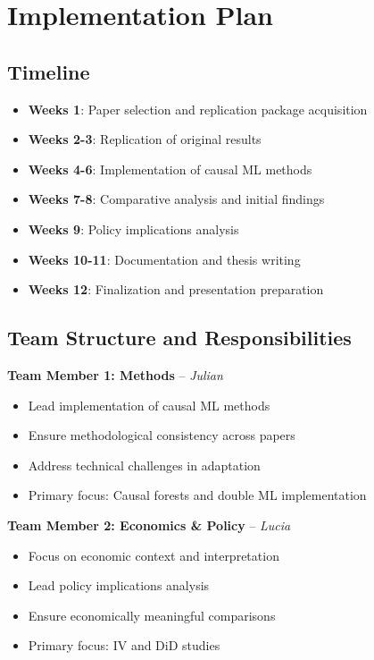 \documentclass[12pt,a4paper]{article}
\begin{document}
\section{Implementation Plan}

\subsection{Timeline}
\begin{itemize}
    \item \textbf{Weeks 1}: Paper selection and replication package acquisition
    \item \textbf{Weeks 2-3}: Replication of original results
    \item \textbf{Weeks 4-6}: Implementation of causal ML methods
    \item \textbf{Weeks 7-8}: Comparative analysis and initial findings
    \item \textbf{Weeks 9}: Policy implications analysis
    \item \textbf{Weeks 10-11}: Documentation and thesis writing
    \item \textbf{Weeks 12}: Finalization and presentation preparation
\end{itemize}

\subsection{Team Structure and Responsibilities}

\textbf{Team Member 1: Methods} -- \textit{Julian}
\begin{itemize}
    \item Lead implementation of causal ML methods
    \item Ensure methodological consistency across papers
    \item Address technical challenges in adaptation
    \item Primary focus: Causal forests and double ML implementation
\end{itemize}

\textbf{Team Member 2: Economics \& Policy} -- \textit{Lucia}
\begin{itemize}
    \item Focus on economic context and interpretation
    \item Lead policy implications analysis
    \item Ensure economically meaningful comparisons
    \item Primary focus: IV and DiD studies
\end{itemize}
\end{document}
